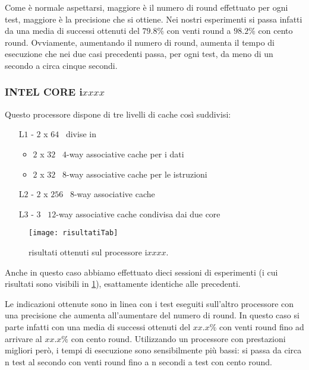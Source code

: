 					Come è normale aspettarsi, maggiore è il numero di round effettuato per ogni test, maggiore è la precisione che si ottiene. Nei nostri esperimenti si passa infatti da una media di successi ottenuti del $79.8\%$ con venti round a $98.2\%$ con cento round. Ovviamente, aumentando il numero di round, aumenta il tempo di esecuzione che nei due casi precedenti passa, per ogni test, da meno di un secondo a circa cinque secondi.
					
				\subsubsection*{INTEL CORE i$xxxx$} 
				
					Questo processore dispone di tre livelli di cache così suddivisi: 
					
					\begin{itemize}
						\item [L$1$ -] $2$ x $64$ \kilobyte \ divise in 
						\begin{itemize}
							\item  $2$ x $32$ \kilobyte \ $4$-way associative cache per i dati
							\item  $2$ x $32$ \kilobyte \ $8$-way associative cache per le istruzioni
						\end{itemize}
						\item[L$2$ -] $2$ x $256$ \kilobyte \ $8$-way associative cache
						\item[L$3$ -] $3$ \megabyte \ $12$-way associative cache condivisa dai due core
					\end{itemize}
					
					\begin{figure}
						\begin{center}
							\texttt{[image: risultatiTab]}
							\caption{risultati ottenuti sul processore i$xxxx$.}
							\label{fig:risultati2}
						\end{center}
					\end{figure}
					
					Anche in questo caso abbiamo effettuato dieci sessioni di esperimenti (i cui risultati sono visibili in \cref{fig:risultati2}), esattamente identiche alle precedenti.
					
					Le indicazioni ottenute sono in linea con i test eseguiti sull'altro processore con una precisione che aumenta all'aumentare del numero di round. In questo caso si parte infatti con una media di successi ottenuti del $xx.x\%$ con venti round fino ad arrivare al $xx.x\%$ con cento round. Utilizzando un processore con prestazioni migliori però, i tempi di esecuzione sono sensibilmente più bassi: si passa da circa n test al secondo con venti round fino a n secondi a test con cento round.
					